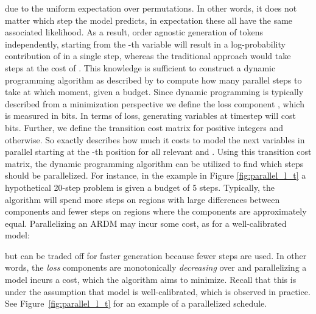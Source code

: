 \documentclass{article} \usepackage{iclr2022_conference,times}
\begin{document}
due to the uniform expectation over permutations. In other words, it does not matter which step  the model predicts, in expectation these all have the same associated likelihood. As a result, order agnostic generation of  tokens independently, starting from the -th variable will result in a log-probability contribution of  in a single step, whereas the traditional approach would take  steps at the cost of . 
This knowledge is sufficient to construct a dynamic programming algorithm as described by \citet{watson2021learningefficientlysample} to compute how many parallel steps to take at which moment, given a budget. Since dynamic programming is typically described from a minimization perspective we define the loss component , which is measured in bits. In terms of loss, generating  variables at timestep  will cost  bits. Further, we define the transition cost matrix  for positive integers  and  otherwise. So  exactly describes how much it costs to model the next  variables in parallel starting at the -th position for all relevant  and . Using this transition cost matrix, the dynamic programming algorithm can be utilized to find which steps should be parallelized. For instance, in the example in Figure \ref{fig:parallel_l_t} a hypothetical 20-step problem is given a budget of 5 steps. Typically, the algorithm will spend more steps on regions with large differences between  components and fewer steps on regions where the  components are approximately equal. Parallelizing an ARDM may incur some cost, as for a well-calibrated model:

but can be traded off for faster generation because fewer steps are used. In other words, the \textit{loss} components  are monotonically \textit{decreasing} over  and parallelizing a model incurs a cost, which the algorithm aims to minimize. Recall that this is under the assumption that model is well-calibrated, which is observed in practice. See Figure~\ref{fig:parallel_l_t} for an example of a parallelized schedule.
\end{document}
